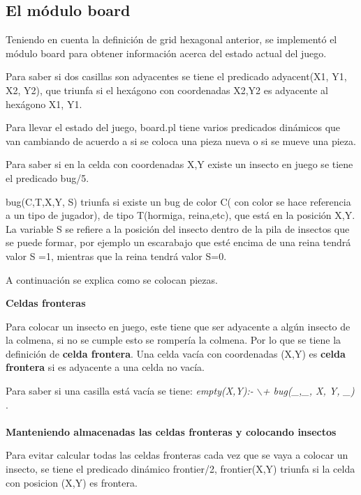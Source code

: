 \documentclass[12pt,letterpaper]{article}
\begin{document}
\subsection*{El m\'odulo board}
	Teniendo en cuenta la definici\'on de grid hexagonal anterior, se implement\'o el m\'odulo board para obtener informaci\'on acerca del estado actual del juego.
	
	Para saber si dos casillas son adyacentes se tiene el predicado adyacent(X1, Y1, X2, Y2), que triunfa si el hex\'agono con coordenadas X2,Y2 es adyacente al hex\'agono X1, Y1.
	
	Para llevar el estado del juego, board.pl tiene varios predicados din\'amicos que van cambiando de acuerdo a si se coloca una pieza nueva o si se mueve una pieza. 
	
	Para saber si en la celda con coordenadas X,Y existe un insecto en juego se tiene el predicado bug/5.
	
	bug(C,T,X,Y, S) triunfa si existe un bug de color C( con color se hace referencia a un tipo de jugador), de tipo T(hormiga, reina,etc), que est\'a en la posici\'on X,Y. La variable S se refiere a la posici\'on del insecto dentro de la pila de insectos que se puede formar, por ejemplo un escarabajo que est\'e encima de una reina tendr\'a valor S =1, mientras que la reina tendr\'a valor S=0.
	
	A continuaci\'on se explica como se colocan piezas.
	
	\begin{flushleft}
		\textbf{Celdas fronteras}
	\end{flushleft} 
	 Para colocar un insecto en juego, este tiene que ser adyacente a alg\'un insecto de la colmena, si no se cumple esto se romper\'ia la colmena. Por lo que se tiene la definici\'on de \textbf{celda frontera}. Una celda vac\'ia con coordenadas (X,Y) es \textbf{celda frontera} si es adyacente a una celda no vac\'ia.
	 
	 Para saber si una casilla est\'a vac\'ia se tiene: \textit{empty(X,Y):- $\backslash$+ bug(\_,\_, X, Y, \_) }.
	 
	 \paragraph{} 
	 	\begin{flushleft}
	 	\textbf{Manteniendo almacenadas las celdas fronteras y colocando insectos}
	 \end{flushleft} 
	 Para evitar calcular todas las celdas fronteras cada vez que se vaya a colocar un insecto, se tiene el predicado din\'amico frontier/2, frontier(X,Y) triunfa si la celda con posicion (X,Y) es frontera.
	 
\end{document}
